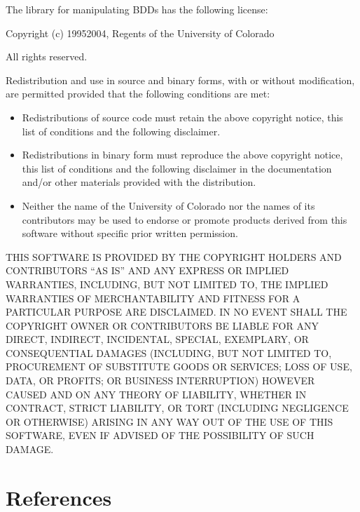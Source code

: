 \documentclass[letterpaper,10pt,english]{sphinxmanual}
\begin{document}
\sphinxAtStartPar
The library  for manipulating BDDs has the following license:

\sphinxAtStartPar
Copyright (c) 1995\sphinxhyphen{}2004, Regents of the University of Colorado

\sphinxAtStartPar
All rights reserved.

\sphinxAtStartPar
Redistribution and use in source and binary forms, with or without
modification, are permitted provided that the following conditions
are met:
\begin{itemize}
\item {} 
\sphinxAtStartPar
Redistributions of source code must retain the above copyright notice, this list of conditions and the following disclaimer.

\item {} 
\sphinxAtStartPar
Redistributions in binary form must reproduce the above copyright notice, this list of conditions and the following disclaimer in the documentation and/or other materials provided with the distribution.

\item {} 
\sphinxAtStartPar
Neither the name of the University of Colorado nor the names of its contributors may be used to endorse or promote products derived from this software without specific prior written permission.

\end{itemize}

\sphinxAtStartPar
THIS SOFTWARE IS PROVIDED BY THE COPYRIGHT HOLDERS AND CONTRIBUTORS
“AS IS” AND ANY EXPRESS OR IMPLIED WARRAN\sphinxhyphen{}TIES, INCLUDING, BUT NOT
LIMITED TO, THE IMPLIED WARRANTIES OF MERCHANTABILITY AND FITNESS
FOR A PARTICULAR PURPOSE ARE DISCLAIMED. IN NO EVENT SHALL THE
COPYRIGHT OWNER OR CONTRIBUTORS BE LIABLE FOR ANY DIRECT, INDIRECT,
INCIDENTAL, SPECIAL, EXEMPLARY, OR CONSEQUENTIAL DAMAGES (INCLUDING,
BUT NOT LIMITED TO, PROCUREMENT OF SUBSTITUTE GOODS OR SERVICES;
LOSS OF USE, DATA, OR PROFITS; OR BUSINESS INTERRUPTION) HOWEVER
CAUSED
AND ON ANY THEORY OF LIABILITY, WHETHER IN CONTRACT, STRICT
LIABILITY, OR TORT (INCLUDING NEGLIGENCE OR OTHERWISE) ARISING IN
ANY WAY OUT OF THE USE OF THIS SOFTWARE, EVEN IF ADVISED OF THE
POSSIBILITY OF SUCH DAMAGE.


\chapter{References}
\label{\detokenize{index:references}}
\sphinxAtStartPar
\end{document}
